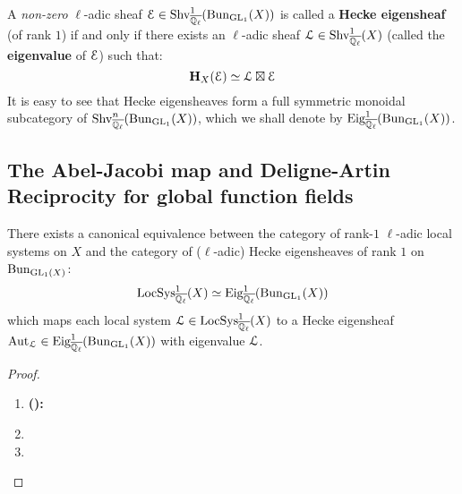         \begin{definition} \label{def: hecke_eigensheaves}
            A \textit{non-zero} $\ell$-adic sheaf $\mathcal{E} \in \mathrm{Shv}_{\overline{\mathbb{Q}_{\ell}}}^1(\mathrm{Bun}_{\operatorname{GL}_1}(X))$ is called a \textbf{Hecke eigensheaf} (of rank $1$) if and only if there exists an $\ell$-adic sheaf $\mathcal{L} \in \mathrm{Shv}_{\overline{\mathbb{Q}_{\ell}}}^1(X)$ (called the \textbf{eigenvalue} of $\mathcal{E}$) such that:
                $$\mathbf{H}_X(\mathcal{E}) \simeq \mathcal{L} \boxtimes \mathcal{E}$$
            It is easy to see that Hecke eigensheaves form a full symmetric monoidal subcategory of $\mathrm{Shv}_{\overline{\mathbb{Q}_{\ell}}}^n(\mathrm{Bun}_{\operatorname{GL}_1}(X))$, which we shall denote by $\mathrm{Eig}^1_{\overline{\mathbb{Q}_{\ell}}}(\mathrm{Bun}_{\operatorname{GL}_1}(X))$.
        \end{definition}
    
    \subsection{The Abel-Jacobi map and Deligne-Artin Reciprocity for global function fields}
        \begin{theorem} \label{theorem: unramified_abelian_geometric_class_field_theory}
            There exists a canonical equivalence between the category of rank-$1$ $\ell$-adic local systems on $X$ and the category of ($\ell$-adic) Hecke eigensheaves of rank $1$ on $\mathrm{Bun}_{\operatorname{GL}_1(X)}$:
                $$\mathrm{LocSys}_{\overline{\mathbb{Q}_{\ell}}}^1(X) \simeq \mathrm{Eig}^1_{\overline{\mathbb{Q}_{\ell}}}(\mathrm{Bun}_{\operatorname{GL}_1}(X))$$
            which maps each local system $\mathcal{L} \in \mathrm{LocSys}_{\overline{\mathbb{Q}_{\ell}}}^1(X)$ to a Hecke eigensheaf $\mathrm{Aut}_{\mathcal{L}} \in \mathrm{Eig}^1_{\overline{\mathbb{Q}_{\ell}}}(\mathrm{Bun}_{\operatorname{GL}_1}(X))$ with eigenvalue $\mathcal{L}$.
        \end{theorem}
            \begin{proof}
                \noindent
                \begin{enumerate}
                    \item \textbf{():}
                    \item
                    \item 
                \end{enumerate}
            \end{proof}

